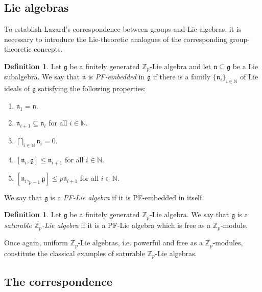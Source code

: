 \documentclass[11pt]{article}
\newcommand{\N}{\mathbb{N}}
\newcommand{\Zp}{\mathbb{Z}_p}
\newcommand{\g}{\mathfrak{g}}
\newcommand{\n}{\mathfrak{n}}
\theoremstyle{plain}
\theoremstyle{definition}
\newtheorem{definition}[lemma]{Definition}
\begin{document}
	
	

	\subsection{Lie algebras}
	
	To establish Lazard's correspondence between groups and Lie algebras, it is necessary to introduce the Lie-theoretic analogues of the corresponding group-theoretic concepts.
	

	
	\begin{definition}
		Let $\g$ be a finitely generated $\Zp$-Lie algebra and let $\n\subseteq \g$ be a Lie subalgebra. We say that $\n$ is \emph{PF-embedded} in $\g$ if there is a family $\{\n_i\}_{i\in \N}$ of Lie ideals of $\g$ satisfying the following properties:
		\begin{enumerate}
			\item[{\bf i.}] $\n_1=\n$.
			
			\item[{\bf ii.}] $\n_{i+1}\subseteq \n_i$ for all $i\in \N$.
			
			\item[{\bf iii.}] $\bigcap_{i\in \N}\n_i=0$.
			
			\item[{\bf iv.}] $[\n_i,\g]\leq \n_{i+1}$ for all $i\in \N$.
			
			\item[{\bf v.}] $[\n_i,_{p-1}\g]\leq p\n_{i+1}$ for all $i\in \N$. 
		\end{enumerate}
		We say that $\g$ is a \emph{PF-Lie algebra} if it is PF-embedded in itself.
	\end{definition}
	
	\begin{definition}
		Let $\g$ be a finitely generated $\Zp$-Lie algebra. We say that $\g$ is a \emph{saturable $\Zp$-Lie algebra} if it is a PF-Lie algebra which is free as a $\Zp$-module. 
	\end{definition}

	Once again, uniform $\Zp$-Lie algebras, i.e. powerful and free as a $\Zp$-modules, constitute the classical examples of saturable $\Zp$-Lie algebras.
	
	
		\subsection{The correspondence}
	
\end{document}
